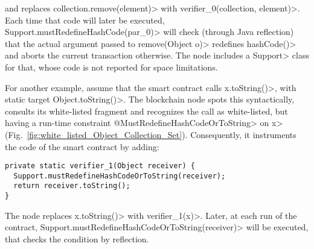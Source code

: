 \noindent
and replaces \<collection.remove(element)> with \<verifier\_0(collection, element)>.
Each time that code will later be executed,
\<Support.mustRedefineHashCode(par\_0)> will check (through Java reflection)
that the actual argument
passed to \<remove(Object o)> redefines \<hashCode()> and aborts
the current transaction otherwise. The node includes a
\<Support> class for that, whose
code is not reported for space limitations.



For another example, assume that the smart contract calls
\<x.toString()>, with static target \<Object.toString()>.
The blockchain node spots this syntactically,
consults its white-listed fragment and recognizes the call as
white-listed, but having a run-time constraint \<@MustRedefineHashCodeOrToString> on
\<x> (Fig.~\ref{fig:white_listed_Object_Collection_Set}).
Consequently, it instruments the code of the smart contract by adding:

{\scriptsize\begin{verbatim}
private static verifier_1(Object receiver) {
  Support.mustRedefineHashCodeOrToString(receiver);
  return receiver.toString();
}
\end{verbatim}}

\noindent
The node replaces \<x.toString()> with \<verifier\_1(x)>.
Later, at each run of the contract,
\<Support.mustRedefineHashCodeOrToString(receiver)> will be executed,
that checks the condition by reflection.

